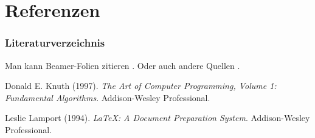 \section{Referenzen}

\begin{frame}[allowframebreaks] %
    \frametitle{Literaturverzeichnis}
    
    Man kann Beamer-Folien zitieren \cite{Knuth97}.
    Oder auch andere Quellen \cite{Lamport94}.
    
    \vspace{1em}
    
    \begin{thebibliography}{99} %
    
        Donald E. Knuth (1997).
        \textit{The Art of Computer Programming, Volume 1: Fundamental Algorithms}.
        Addison-Wesley Professional.
        
        Leslie Lamport (1994).
        \textit{\LaTeX: A Document Preparation System}.
        Addison-Wesley Professional.
    
    \end{thebibliography}
\end{frame}

